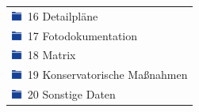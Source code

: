 \begin{center}
\begin{longtable}{l}
		\includegraphics[width=0.4cm]{bilder/OrdnerIconZu.png} \hspace*{0.04cm} 16 Detailpläne\\
		\includegraphics[width=0.4cm]{bilder/OrdnerIconZu.png} \hspace*{0.04cm} 17 Fotodokumentation\\
		\includegraphics[width=0.4cm]{bilder/OrdnerIconZu.png} \hspace*{0.04cm} 18 Matrix\\
		\includegraphics[width=0.4cm]{bilder/OrdnerIconZu.png} \hspace*{0.04cm} 19 Konservatorische Maßnahmen\\
		\includegraphics[width=0.4cm]{bilder/OrdnerIconZu.png} \hspace*{0.04cm} 20 Sonstige Daten\\
		
		\bottomrule
	\end{longtable}
\end{center}

